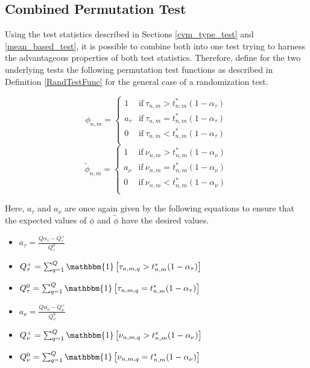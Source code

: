 \documentclass[12pt, a4paper]{article}
\theoremstyle{MAstyle} \newtheorem{assumption}{Assumption}[section]
\theoremstyle{MAstyle} \newtheorem{definition}{Definition}[section]
\theoremstyle{MAstyle} \newtheorem{theorem}{Theorem}[section]
\begin{document}
		\subsection{Combined Permutation Test}
			Using the test statistics described in Sections \ref{cvm_type_test} and \ref{mean_based_test}, it is possible to combine both into one test trying to harness the advantageous properties of both test statistics. Therefore, define for the two underlying tests the following permutation test functions as described in Definition \ref{RandTestFunc} for the general case of a randomization test.
			\begin{multicols}{2}
				\noindent
				\begin{equation*}
					\phi_{n,m} = \begin{cases}
						1 &\text{if} \ \tau_{n,m} > t^{*}_{n,m}(1-\alpha_{\tau}) \\
						a_{\tau} &\text{if} \ \tau_{n,m} = t^{*}_{n,m}(1-\alpha_{\tau}) \\
						0 &\text{if} \ \tau_{n,m} < t^{*}_{n,m}(1-\alpha_{\tau}) \\
					\end{cases}
				\end{equation*}
				\begin{equation}
					\tilde{\phi}_{n,m} = \begin{cases}
						1 &\text{if} \ \nu_{n,m} > t^{*}_{n,m}(1-\alpha_{\nu}) \\
						a_{\nu} &\text{if} \ \nu_{n,m} = t^{*}_{n,m}(1-\alpha_{\nu}) \\
						0 &\text{if} \ \nu_{n,m} < t^{*}_{n,m}(1-\alpha_{\nu}) \\
					\end{cases}
				\end{equation}
			\end{multicols}
			Here, $a_\tau$ and $a_\nu$ are once again given by the following equations to ensure that the expected values of $\phi$ and $\tilde{\phi}$ have the desired values.
			\begin{multicols}{2}
				\begin{itemize}
					\item $a_{\tau} = \frac{Q\alpha_{\tau} - Q_{\tau}^{+}}{Q_{\tau}^{0}}$ 
					\item $Q_{\tau}^{+} = \sum_{q = 1}^{Q}\mathbbm{1}\left[\tau_{n,m,q} > t^{*}_{n,m}(1-\alpha_{\tau})\right]$
					\item $Q_{\tau}^{0} = \sum_{q = 1}^{Q}\mathbbm{1}\left[\tau_{n,m,q} = t^{*}_{n,m}(1-\alpha_{\tau})\right]$
					\item $a_{\nu} = \frac{Q\alpha_{\nu} - Q_{\nu}^{+}}{Q_{\nu}^{0}}$ 
					\item $Q_{\nu}^{+} = \sum_{q = 1}^{Q}\mathbbm{1}\left[\nu_{n,m,q} > t^{*}_{n,m}(1-\alpha_{\nu})\right]$
					\item $Q_{\nu}^{0} = \sum_{q = 1}^{Q}\mathbbm{1}\left[\nu_{n,m,q} = t^{*}_{n,m}(1-\alpha_{\nu})\right]$
				\end{itemize} 
			\end{multicols}
\end{document}
